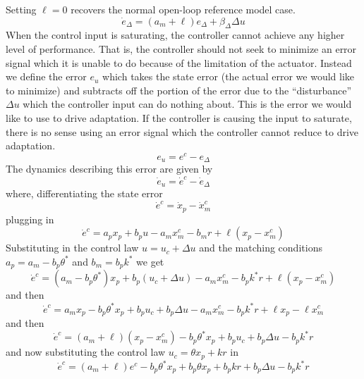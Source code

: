 Setting $\ell=0$ recovers the normal open-loop reference model case.
\begin{equation*}
  \dot{e}_{\Delta}=(a_{m}+\ell)e_{\Delta}+\beta_{\Delta}\Delta u
\end{equation*}
When the control input is saturating, the controller cannot achieve any higher level of performance.
That is, the controller should not seek to minimize an error signal which it is unable to do because of the limitation of the actuator.
Instead we define the error $e_{u}$ which takes the state error (the actual error we would like to minimize) and subtracts off the portion of the error due to the ``disturbance'' $\Delta u$ which the controller input can do nothing about.
This is the error we would like to use to drive adaptation.
If the controller is causing the input to saturate, there is no sense using an error signal which the controller cannot reduce to drive adaptation.
\begin{equation*}
  e_{u}=e^{c}-e_{\Delta}
\end{equation*}
The dynamics describing this error are given by
\begin{equation*}
  \dot{e}_{u}=\dot{e}^{c}-\dot{e}_{\Delta}
\end{equation*}
where, differentiating the state error
\begin{equation*}
  \dot{e}^{c}=\dot{x}_{p}-\dot{x}_{m}^{c}
\end{equation*}
plugging in
\begin{equation*}
  \dot{e}^{c}=a_{p}x_{p}+b_{p}u-a_{m}x_{m}^{c}-b_{m}r+\ell(x_{p}-x_{m}^{c})
\end{equation*}
Substituting in the control law $u=u_{c}+\Delta u$ and the matching conditions $a_{p}=a_{m}-b_{p}\theta^{*}$ and $b_{m}=b_{p}k^{*}$ we get
\begin{equation*}
  \dot{e}^{c}=(a_{m}-b_{p}\theta^{*})x_{p}+b_{p}(u_{c}+\Delta u)-a_{m}x_{m}^{c}-b_{p}k^{*}r+\ell(x_{p}-x_{m}^{c})
\end{equation*}
and then
\begin{equation*}
  \dot{e}^{c}=a_{m}x_{p}-b_{p}\theta^{*}x_{p}+b_{p}u_{c}+b_{p}\Delta u-a_{m}x_{m}^{c}-b_{p}k^{*}r+\ell x_{p}-\ell x_{m}^{c}
\end{equation*}
and then
\begin{equation*}
  \dot{e}^{c}=(a_{m}+\ell)(x_{p}-x_{m}^{c})-b_{p}\theta^{*}x_{p}+b_{p}u_{c}+b_{p}\Delta u-b_{p}k^{*}r
\end{equation*}
and now substituting the control law $u_{c}=\theta x_{p}+kr$ in
\begin{equation*}
  \dot{e}^{c}=(a_{m}+\ell)e^{c}-b_{p}\theta^{*}x_{p}+b_{p}\theta x_{p}+b_{p}kr+b_{p}\Delta u-b_{p}k^{*}r
\end{equation*}

